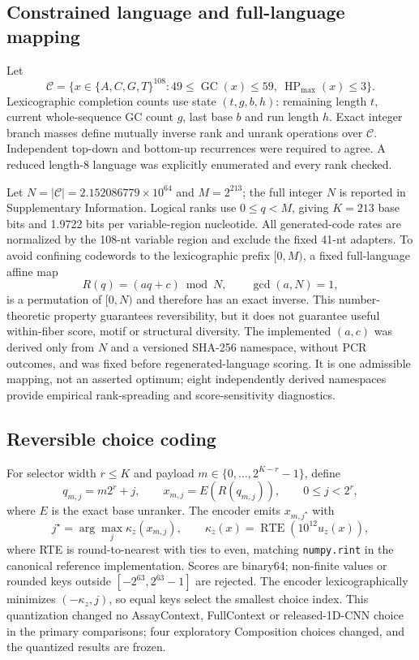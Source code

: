 \documentclass[10pt]{article}
\newcommand{\DNA}{\{A,C,G,T\}}
\begin{document}
\subsection{Constrained language and full-language mapping}

Let
\[
 \mathcal C=\{x\in\DNA^{108}:49\leq\operatorname{GC}(x)\leq59,\ 
 \operatorname{HP}_{\max}(x)\leq3\}.
\]
Lexicographic completion counts use state $(t,g,b,h)$: remaining length $t$, current whole-sequence GC count $g$, last base $b$ and run length $h$. Exact integer branch masses define mutually inverse rank and unrank operations over $\mathcal C$. Independent top-down and bottom-up recurrences were required to agree. A reduced length-8 language was explicitly enumerated and every rank checked.

Let $N=|\mathcal C|=2.152086779\times10^{64}$ and $M=2^{213}$; the full integer $N$ is reported in Supplementary Information. Logical ranks use $0\leq q<M$, giving $K=213$ base bits and 1.9722 bits per variable-region nucleotide. All generated-code rates are normalized by the 108-nt variable region and exclude the fixed 41-nt adapters. To avoid confining codewords to the lexicographic prefix $[0,M)$, a fixed full-language affine map
\[
 R(q)=(aq+c)\bmod N,\qquad \gcd(a,N)=1,
\]
is a permutation of $[0,N)$ and therefore has an exact inverse. This number-theoretic property guarantees reversibility, but it does not guarantee useful within-fiber score, motif or structural diversity. The implemented $(a,c)$ was derived only from $N$ and a versioned SHA-256 namespace, without PCR outcomes, and was fixed before regenerated-language scoring. It is one admissible mapping, not an asserted optimum; eight independently derived namespaces provide empirical rank-spreading and score-sensitivity diagnostics.

\subsection{Reversible choice coding}

For selector width $r\leq K$ and payload $m\in\{0,\ldots,2^{K-r}-1\}$, define
\[
 q_{m,j}=m2^r+j,\qquad
 x_{m,j}=E\!\left(R(q_{m,j})\right),\qquad 0\leq j<2^r,
\]
where $E$ is the exact base unranker. The encoder emits $x_{m,j^\star}$ with
\[
 j^\star=\arg\max_j \kappa_z(x_{m,j}),\qquad
 \kappa_z(x)=\operatorname{RTE}\!\left(10^{12}u_z(x)\right),
\]
where RTE is round-to-nearest with ties to even, matching \texttt{numpy.rint} in the canonical reference implementation. Scores are binary64; non-finite values or rounded keys outside $[-2^{63},2^{63}-1]$ are rejected. The encoder lexicographically minimizes $(-\kappa_z,j)$, so equal keys select the smallest choice index. This quantization changed no AssayContext, FullContext or released-1D-CNN choice in the primary comparisons; four exploratory Composition choices changed, and the quantized results are frozen.
\end{document}
